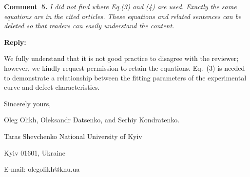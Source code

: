 \documentclass{WileyMSP-template}
\begin{document}




\vspace{1cm}
\noindent
\textcolor[rgb]{0.00,0.50,1.00}{\textbf{Comment~5.}}
\emph{ I did not find where Eq.(3) and (4) are used.
Exactly the same equations are in the cited articles.
These equations and related sentences can be deleted so that readers can easily understand the content.}

\noindent
\textcolor[rgb]{0.51,0.00,0.00}{\textbf{Reply:}}

We fully understand that it is not good practice to disagree with the reviewer; 
however, we kindly request permission to retain the equations.
Eq.~(3) is needed to demonstrate a relationship between the fitting parameters of the experimental curve and defect characteristics.




\vspace{3cm}

Sincerely yours,

Oleg Olikh, Oleksandr Datsenko, and Serhiy Kondratenko.


Taras Shevchenko National University of Kyiv


Kyiv 01601, Ukraine

E-mail: olegolikh@knu.ua



\end{document}

